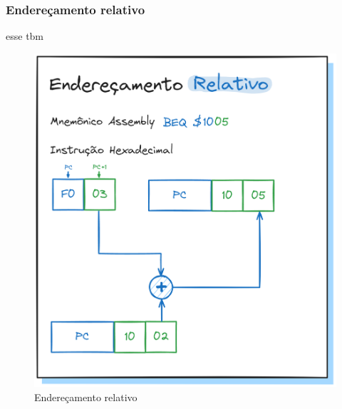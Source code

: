 \documentclass[
	12pt,				  %
	openright,		%
	a4paper,			%
	english,			%
	french,				%
	spanish,			%
	brazil,				%
]{abntex2}
\begin{document}
\subsubsection{Endereçamento relativo}
esse tbm
\begin{figure}[h]
	\centering
	\caption{Endereçamento relativo} \label{fig:address:rel}
	\includegraphics[scale=0.25]{../assets/img/addressing-modes-rel.png}
\end{figure}
\end{document}
